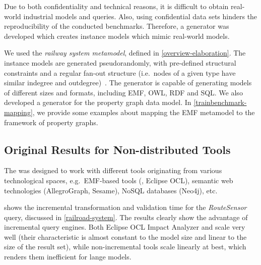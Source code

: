 Due to both confidentiality and technical reasons, it is difficult to obtain real-world industrial models and queries. Also, using confidential data sets hinders the reproducibility of the conducted benchmarks. Therefore, a generator was developed which creates instance models which mimic real-world models.

We used  the \emph{railway system metamodel}, defined in \autoref{overview-elaboration}. The instance models are generated pseudorandomly, with pre-defined structural constraints and a regular fan-out structure (i.e.\ nodes of a given type have similar indegree and outdegree)~\cite{ASE2013}. The generator is capable of generating models of different sizes and formats, including EMF, OWL, RDF and SQL. We also developed a generator for the property graph data model. In \autoref{trainbenchmark-mapping}, we provide some examples about mapping the EMF metamodel to the framework of property graphs.

\subsection{Original Results for Non-distributed Tools}


The \tb{} was designed to work with different tools originating from various technological spaces, e.g.\ EMF-based tools (\eiq{}, Eclipse OCL), semantic web technologies (AllegroGraph, Sesame), NoSQL databases (Neo4j), etc.

 shows the incremental transformation and validation time for the \emph{RouteSensor} query, discussed in \autoref{railroad-system}. The results clearly show the advantage of incremental query engines. Both Eclipse OCL Impact Analyzer and \eiq{} scale very well (their characteristic is almost constant to the model size and linear to the size of the result set), while non-incremental tools scale linearly at best, which renders them inefficient for lange models. %




